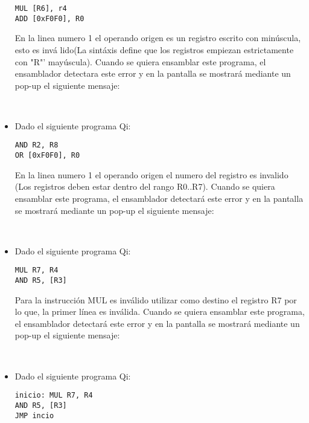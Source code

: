 \begin{itemize}
\begin{verbatim}
MUL [R6], r4
ADD [0xF0F0], R0
\end{verbatim}

En la linea numero 1 el operando origen es un registro escrito con minúscula, esto es invá lido(La sintáxis define que los registros empiezan estrictamente con "R"' mayúscula). Cuando se quiera ensamblar este programa, el ensamblador detectara este error y en la pantalla se mostrará mediante un pop-up el siguiente mensaje:

 \\ 

\item Dado el siguiente programa Qi:\\

\begin{verbatim}
AND R2, R8
OR [0xF0F0], R0
\end{verbatim}

En la linea numero 1 el operando origen el numero del registro es invalido (Los registros deben estar dentro del rango R0..R7). Cuando se quiera ensamblar este programa, el ensamblador detectará este error y en la pantalla se mostrará mediante un pop-up el siguiente mensaje:

 \\ 

\item Dado el siguiente programa Qi:\\

\begin{verbatim}
MUL R7, R4
AND R5, [R3]
\end{verbatim}

Para la instrucción MUL es inválido utilizar como destino el registro R7 por lo que, la primer línea es inválida. Cuando se quiera ensamblar este programa, el ensamblador detectará este error y en la pantalla se mostrará mediante un pop-up el siguiente mensaje:

 \\ 

\item Dado el siguiente programa Qi:\\

\begin{verbatim}
inicio: MUL R7, R4
AND R5, [R3]
JMP incio
\end{verbatim}


\end{itemize}
